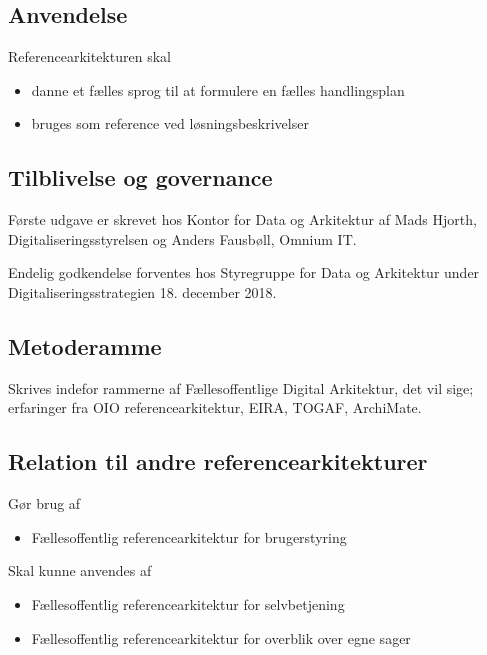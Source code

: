 \subsection{Anvendelse}\label{anvendelse}

Referencearkitekturen skal

\begin{itemize}
\tightlist
\item
  danne et fælles sprog til at formulere en fælles handlingsplan
\item
  bruges som reference ved løsningsbeskrivelser
\end{itemize}

\subsection{Tilblivelse og governance}\label{tilblivelse-og-governance}

Første udgave er skrevet hos Kontor for Data og Arkitektur af Mads
Hjorth, Digitaliseringsstyrelsen og Anders Fausbøll, Omnium IT.

Endelig godkendelse forventes hos Styregruppe for Data og Arkitektur
under Digitaliseringsstrategien 18. december 2018.

\subsection{Metoderamme}\label{metoderamme}

Skrives indefor rammerne af Fællesoffentlige Digital Arkitektur, det vil
sige; erfaringer fra OIO referencearkitektur, EIRA, TOGAF, ArchiMate.

\subsection{Relation til andre
referencearkitekturer}\label{relation-til-andre-referencearkitekturer}

Gør brug af

\begin{itemize}
\tightlist
\item
  Fællesoffentlig referencearkitektur for brugerstyring
\end{itemize}

Skal kunne anvendes af

\begin{itemize}
\tightlist
\item
  Fællesoffentlig referencearkitektur for selvbetjening
\item
  Fællesoffentlig referencearkitektur for overblik over egne sager
\end{itemize}

